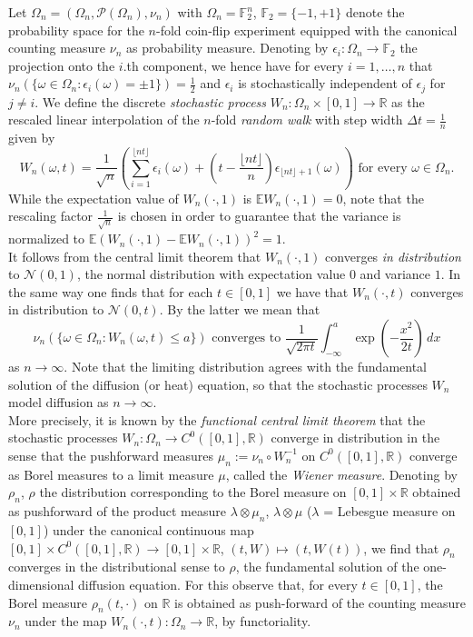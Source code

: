 \documentclass[a4paper,11pt]{amsart}
\newcommand{\RR}{\mathbb{R}}
\newcommand{\FF}{\mathbb{F}}
\newcommand{\EE}{\mathbb{E}}
\begin{document}
Let $\Omega_n=(\Omega_n,\mathcal{P}(\Omega_n),\nu_n)$ with $\Omega_n=\FF_2^n$, $\FF_2=\{-1,+1\}$ denote the probability space for the $n$-fold coin-flip experiment equipped with the canonical counting measure $\nu_n$ as probability measure. Denoting by $\epsilon_i:\Omega_n\to\FF_2$ the projection onto the $i$.th component, we hence have for every $i=1,\ldots,n$ that $\nu_n(\{\omega\in\Omega_n:\epsilon_i(\omega)=\pm 1\})=\frac{1}{2}$ and $\epsilon_i$ is stochastically independent of $\epsilon_j$ for $j\neq i$. We define the discrete \emph{stochastic process} $W_n:\Omega_n\times [0,1]\to\RR$ as the rescaled linear interpolation of the $n$-fold \emph{random walk} with step width $\Delta t=\frac{1}{n}$ given by \[W_n(\omega,t)=\frac{1}{\sqrt{n}}\left(\sum_{i=1}^{\lfloor nt\rfloor} \epsilon_i(\omega)+\left(t-\frac{\lfloor nt\rfloor}{n}\right) \epsilon_{\lfloor nt\rfloor+1}(\omega)\right)\,\,\textrm{for every}\,\,\omega\in\Omega_n.\] While the expectation value of $W_n(\cdot,1)$ is $\EE W_n(\cdot,1)=0$, note that the rescaling factor $\frac{1}{\sqrt{n}}$ is chosen in order to guarantee that the variance is normalized to $\EE\left(W_n(\cdot,1)-\EE W_n(\cdot,1)\right)^2=1$.\\\indent 
It follows from the central limit theorem that $W_n(\cdot,1)$ converges \emph{in distribution} to $\mathcal{N}(0,1)$, the normal distribution with expectation value $0$ and variance $1$. In the same way one finds that for each $t\in [0,1]$ we have that $W_n(\cdot,t)$ converges in distribution to $\mathcal{N}(0,t)$. By the latter we mean that \[\nu_n(\{\omega\in\Omega_n:W_n(\omega,t)\leq a\})\,\,\textrm{converges to}\,\, \frac{1}{\sqrt{2\pi t}}\int_{-\infty}^a \exp\left(-\frac{x^2}{2t}\right)\,dx\] as $n\to\infty$. Note that the limiting distribution agrees with the fundamental solution of the diffusion (or heat) equation, so that the stochastic processes $W_n$ model diffusion as $n\to\infty$.\\\indent 
More precisely, it is known by the \emph{functional central limit theorem} that the stochastic processes $W_n:\Omega_n\to C^0([0,1],\RR)$ converge in distribution in the sense that the pushforward measures $\mu_n:=\nu_n\circ W_n^{-1}$ on $C^0([0,1],\RR)$ converge as Borel measures to a limit measure $\mu$, called the \emph{Wiener measure}. Denoting by $\rho_n$, $\rho$ the distribution corresponding to the Borel measure on $[0,1]\times\RR$ obtained as pushforward of the product measure $\lambda\otimes\mu_n$, $\lambda\otimes\mu$ ($\lambda$ = Lebesgue measure on $[0,1]$) under the canonical continuous map $[0,1]\times C^0([0,1],\RR)\to [0,1]\times\RR$, $(t,W)\mapsto (t,W(t))$, we find that $\rho_n$ converges in the distributional sense to $\rho$, the fundamental solution of the one-dimensional diffusion equation. For this observe that, for every $t\in [0,1]$, the Borel measure $\rho_n(t,\cdot)$ on $\RR$ is obtained as push-forward of the counting measure $\nu_n$ under the map $W_n(\cdot,t):\Omega_n\to\RR$,  by functoriality.\\\indent 
\end{document}

